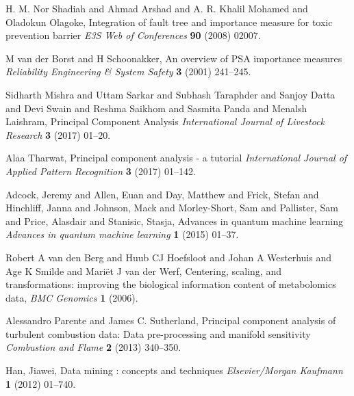 \documentclass{ws-m3as}
\begin{document}
\begin{thebibliography}{0}
H. M. Nor Shadiah and Ahmad Arshad and A. R. Khalil Mohamed and Oladokun Olagoke, Integration of fault tree and importance measure for toxic prevention barrier {\it E3S Web of Conferences} {\bf 90} (2008) 02007.

M van der Borst and H Schoonakker, An overview of {PSA} importance measures {\it Reliability Engineering {\&} System Safety} {\bf 3} (2001) 241--245.

Sidharth Mishra and Uttam Sarkar and Subhash Taraphder and Sanjoy Datta and Devi Swain and Reshma Saikhom and Sasmita Panda and Menalsh Laishram, Principal Component Analysis {\it International Journal of Livestock Research} {\bf 3} (2017) 01--20.

Alaa Tharwat, Principal component analysis - a tutorial {\it International Journal of Applied Pattern Recognition} {\bf 3} (2017) 01--142.

Adcock, Jeremy and Allen, Euan and Day, Matthew and Frick, Stefan and Hinchliff, Janna and Johnson, Mack and Morley-Short, Sam and Pallister, Sam and Price, Alasdair and Stanisic, Stasja, Advances in quantum machine learning {\it Advances in quantum machine learning} {\bf 1} (2015) 01--37.

Robert A van den Berg and Huub CJ Hoefsloot and Johan A Westerhuis and Age K Smilde and Mariët J van der Werf, Centering,  scaling,  and transformations: improving the biological information content of metabolomics data, {\it {BMC} Genomics} {\bf 1} (2006).

Alessandro Parente and James C. Sutherland, Principal component analysis of turbulent combustion data: Data pre-processing and manifold sensitivity {\it Combustion and Flame} {\bf 2} (2013) 340--350.

Han, Jiawei, Data mining : concepts and techniques {\it Elsevier/Morgan Kaufmann} {\bf 1} (2012) 01--740.

\end{thebibliography}
\end{document}
